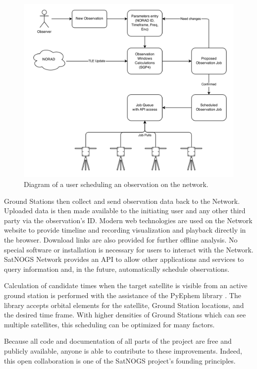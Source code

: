 \documentclass[conference,letterpaper,12pt]{IEEEtran}
\newlength{\imgwidth}
\begin{document}
\begin{figure}[htbp]
\centering
\includegraphics[width=\imgwidth]{fig/network-flow}
\caption{Diagram of a user scheduling an observation on the network.}
\label{f:network}
\end{figure}

Ground Stations then collect and send observation data back to the Network.
Uploaded data is then made available to the initiating user and any other third party via the observation's ID.
Modern web technologies are used on the Network website to provide timeline and recording visualization and playback directly in the browser.
Download links are also provided for further offline analysis.
No special software or installation is necessary for users to interact with the Network.
SatNOGS Network provides an API to allow other applications and services to query information and, in the future, automatically schedule observations.

Calculation of candidate times when the target satellite is visible from an active ground station is performed with the assistance of the PyEphem library \cite{PyEphem}.
The library accepts orbital elements for the satellite, Ground Station locations, and the desired time frame.
With higher densities of Ground Stations which can see multiple satellites, this scheduling can be optimized for many factors.

Because all code and documentation of all parts of the project are free and publicly available, anyone is able to contribute to these improvements.
Indeed, this open collaboration is one of the SatNOGS project's founding principles.
\end{document}
